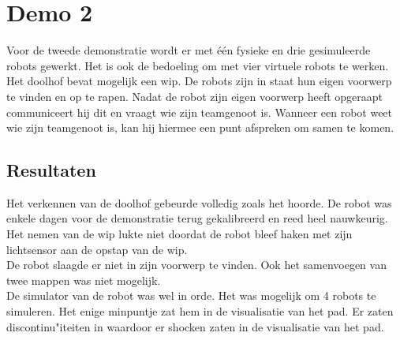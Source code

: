 \documentclass[tt3]{penoverslag}
\begin{document}

\section{Demo 2}
\label{Asec:demo2}
Voor de tweede demonstratie wordt er met \'e\'en fysieke en drie gesimuleerde robots gewerkt. Het is ook de bedoeling om  met vier virtuele robots te werken. Het doolhof bevat mogelijk een wip. De robots zijn in staat hun eigen voorwerp te vinden en op te rapen. Nadat de robot zijn eigen voorwerp heeft opgeraapt communiceert hij dit en vraagt wie zijn teamgenoot is. Wanneer een robot weet wie zijn teamgenoot is, kan hij hiermee een punt afspreken om samen te komen.\\

\subsection{Resultaten}
\label{Assec:result2}
Het verkennen van de doolhof gebeurde volledig zoals het hoorde. De robot was enkele dagen voor de demonstratie terug gekalibreerd en reed heel nauwkeurig. Het nemen van de wip lukte niet doordat de robot bleef haken met zijn lichtsensor aan de opstap van de wip.\\
De robot slaagde er niet in zijn voorwerp te vinden. Ook het samenvoegen van twee mappen was niet mogelijk.\\
De simulator van de robot was wel in orde. Het was mogelijk om 4 robots te simuleren. Het enige minpuntje zat hem in de visualisatie van het pad. Er zaten discontinu"iteiten in waardoor er shocken zaten in de visualisatie van het pad. \\
\end{document}
